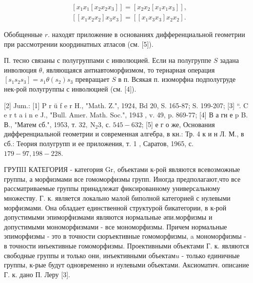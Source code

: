 \documentclass[10pt]{article}
\begin{document}
\[

\begin{aligned}

& {\left[x_{1} x_{1}\left[x_{2} x_{2} x_{3}\right]\right]=\left[x_{2} x_{2}\left[x_{1} x_{1} x_{3}\right]\right],} \\

& {\left[\left[x_{1} x_{2} x_{2}\right] x_{3} x_{3}\right]=\left[\left[x_{1} x_{3} x_{3}\right] x_{2} x_{2}\right] .}

\end{aligned}

\]



Обобщенные $r$. находят приложение в основаниях дифференциальной геометрии при рассмотрении координатных атласов (см. [5]).



П. тесно связаны с полугруппами с инволюцией. Если на полугруппе $S$ задана инволюция $\theta$, являющаяся антиавтоморфизмом, то тернарная операция $\left[s_{1} s_{2} s_{3}\right]=s_{1} \theta\left(s_{2}\right) s_{3}$ превращает $S$ в п. Всякая п. изоморфна подполугруде нек-рой полугруппы с инволюцией (см. [4]).



[2] Jum.: [1] P r ü f e r H., "Math. Z.", 1924, Bd 20, S. 165-87; S. 199-207; [3] “. $\mathrm{C}$ e r t a i n e J., "Bull. Amer. Math. Soc.", 1943 , v. 49, p. 869-77; [4] В а гн е p B. В., "Матем сб.", 1953, т. $32, \mathrm{~N}_{2} 3$, с. $545-632$; [5] е г о же, Основания дифференциальной геометрии и современная алгебра, в кн.: Тр. 4 к и н Л. М., в сб.: Теория полугрупп и ее приложения, т. 1 , Саратов, 1965, с. $179-97,198-228$.



ГРУПII КАТЕГОРИЯ - категория Gr, объектами к-рой являются всевозможные группы, а морфизмами все гомоморфизмы групп. Иногда предполагают,что все рассматриваемые группы принадлежат фиксированному универсальному множеству. Г. к. является локально малой биполной категорией с нулевыми морфизмами. Она обладает единственной структурой бикатегории, в к-рой допустимыми эпиморфизмами являются нормальные әпи.морфизмы и допустимыми мономорфизмами - все мономорфизмы. Причем нормальные эпиморфизмы - это в точности сюръективные гомоморфизмы, a мономорфизмы - в точности инъективные гомоморфизмы. Проективными объектами Г. к. являются свободные группы и только они, инъективными объекта$м u$ - только единичные группы, к-рые будут одновременно и нулевыми объектами. Аксиоматич. описание Г. к. дано П. Леру [3].
\end{document}
